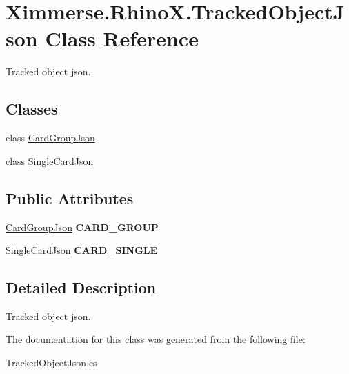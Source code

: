 \hypertarget{class_ximmerse_1_1_rhino_x_1_1_tracked_object_json}{}\section{Ximmerse.\+Rhino\+X.\+Tracked\+Object\+Json Class Reference}
\label{class_ximmerse_1_1_rhino_x_1_1_tracked_object_json}


Tracked object json.  


\subsection*{Classes}
\begin{DoxyCompactItemize}
\item 
class \mbox{\hyperlink{class_ximmerse_1_1_rhino_x_1_1_tracked_object_json_1_1_card_group_json}{Card\+Group\+Json}}
\item 
class \mbox{\hyperlink{class_ximmerse_1_1_rhino_x_1_1_tracked_object_json_1_1_single_card_json}{Single\+Card\+Json}}
\end{DoxyCompactItemize}
\subsection*{Public Attributes}
\begin{DoxyCompactItemize}
\item 
\mbox{\label{class_ximmerse_1_1_rhino_x_1_1_tracked_object_json_a2cff96b323cdee709f70857796362631}} 
\mbox{\hyperlink{class_ximmerse_1_1_rhino_x_1_1_tracked_object_json_1_1_card_group_json}{Card\+Group\+Json}} {\bfseries C\+A\+R\+D\+\_\+\+G\+R\+O\+UP}
\item 
\mbox{\label{class_ximmerse_1_1_rhino_x_1_1_tracked_object_json_aaaffeedb3f81e122cf331b59836d354a}} 
\mbox{\hyperlink{class_ximmerse_1_1_rhino_x_1_1_tracked_object_json_1_1_single_card_json}{Single\+Card\+Json}} {\bfseries C\+A\+R\+D\+\_\+\+S\+I\+N\+G\+LE}
\end{DoxyCompactItemize}


\subsection{Detailed Description}
Tracked object json. 



The documentation for this class was generated from the following file\+:\begin{DoxyCompactItemize}
\item 
Tracked\+Object\+Json.\+cs\end{DoxyCompactItemize}
